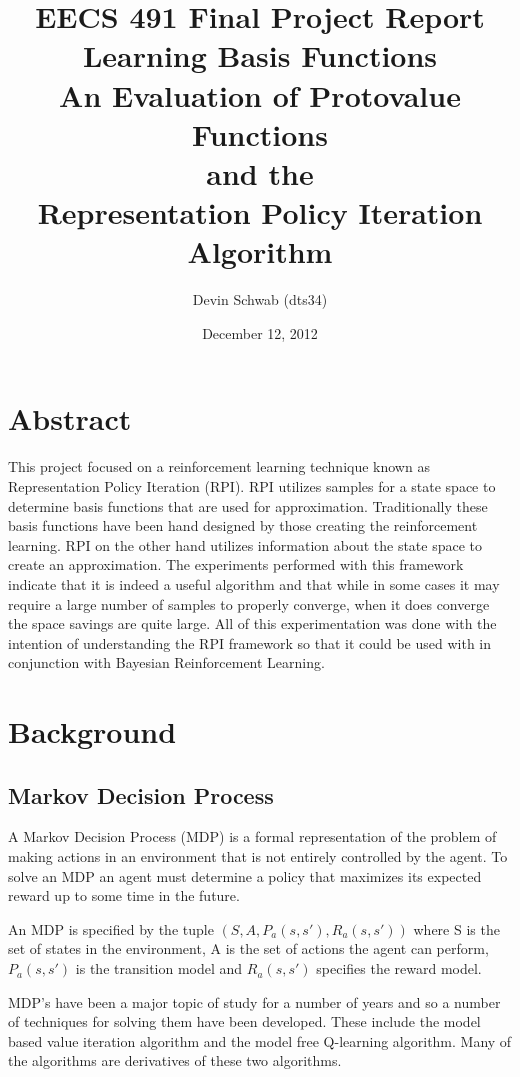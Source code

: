 \documentclass[12pt, letterpaper, final]{report}
\author{Devin Schwab (dts34)}
\title{EECS 491 Final Project Report \\ 
\vspace{5 mm}
Learning Basis Functions\\ 
\vspace{5 mm}
 An Evaluation of Protovalue Functions\\
 and the\\
 Representation Policy Iteration Algorithm}
\date{December 12, 2012}
\begin{document}
\maketitle

\section{Abstract}

This project focused on a reinforcement learning technique known as
Representation Policy Iteration (RPI). RPI utilizes samples for a
state space to determine basis functions that are used for
approximation. Traditionally these basis functions have been hand
designed by those creating the reinforcement learning. RPI on the
other hand utilizes information about the state space to create an
approximation. The experiments performed with this framework indicate
that it is indeed a useful algorithm and that while in some cases it may require a
large number of samples to properly converge, when it does converge
the space savings are quite large. All of this experimentation was
done with the intention of understanding the RPI framework so that it
could be used with in conjunction with Bayesian Reinforcement Learning.

\tableofcontents
\newpage
\listoffigures

\section{Background}

\subsection*{Markov Decision Process}

A Markov Decision Process (MDP) is a formal representation of the
problem of making actions in an environment that is not entirely
controlled by the agent. To solve an MDP an agent must determine a
policy that maximizes its expected reward up to some time in the
future.

An MDP is specified by the tuple $(S, A, P_a(s,s'), R_a(s,s'))$ where
S is the set of states in the environment, A is the set of actions the
agent can perform, $P_a(s,s')$ is the transition model and $R_a(s,s')$
specifies the reward model.

MDP's have been a major topic of study for a number of years and so a
number of techniques for solving them have been developed. These
include the model based value iteration algorithm and the model free
Q-learning algorithm. Many of the algorithms are derivatives of these
two algorithms.
\end{document}
